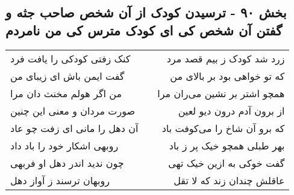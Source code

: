 \begin{center}
\section*{بخش ۹۰ - ترسیدن کودک از آن شخص صاحب جثه و گفتن آن شخص کی ای کودک مترس کی من نامردم}
\label{sec:sh090}
\begin{longtable}{l p{0.5cm} r}
کنک زفتی کودکی را یافت فرد
&&
زرد شد کودک ز بیم قصد مرد
\\
گفت ایمن باش ای زیبای من
&&
که تو خواهی بود بر بالای من
\\
من اگر هولم مخنث دان مرا
&&
همچو اشتر بر نشین می‌ران مرا
\\
صورت مردان و معنی این چنین
&&
از برون آدم درون دیو لعین
\\
آن دهل را مانی ای زفت چو عاد
&&
که برو آن شاخ را می‌کوفت باد
\\
روبهی اشکار خود را باد داد
&&
بهر طبلی همچو خیک پر ز باد
\\
چون ندید اندر دهل او فربهی
&&
گفت خوکی به ازین خیک تهی
\\
روبهان ترسند ز آواز دهل
&&
عاقلش چندان زند که لا تقل
\\
\end{longtable}
\end{center}
